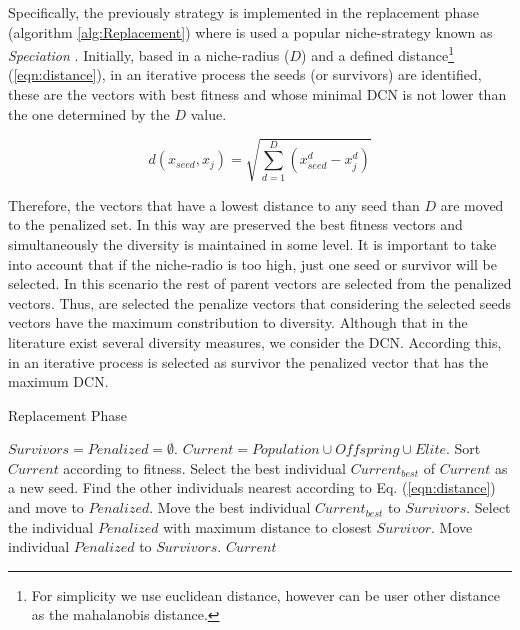 %
Specifically, the previously strategy is implemented in the replacement phase (algorithm \ref{alg:Replacement}) where is used a popular niche-strategy known as \textit{Speciation} \cite{yang2017multimodal}.
%
Initially, based in a niche-radius ($D$) and a defined distance\footnote{For simplicity we use euclidean distance, however can be user other distance as the mahalanobis distance.} (\ref{eqn:distance}), in an iterative process the seeds (or survivors) are identified, these are the vectors with best fitness and whose minimal DCN is not lower than the one determined by the $D$ value.

\begin{equation}\label{eqn:distance}
d ( x_{seed}, x_j ) = \sqrt{ \sum_{d=1}^D (x_{seed}^d - x_j^d )  } 
\end{equation}

%
Therefore, the vectors that have a lowest distance to any seed than $D$ are moved to the penalized set.
%
In this way are preserved the best fitness vectors and simultaneously the diversity is maintained in some level.
%
It is important to take into account that if the niche-radio is too high, just one seed or survivor will be selected.
%
In this scenario the rest of parent vectors are selected from the penalized vectors.
%
Thus, are selected the penalize vectors that considering the selected seeds vectors have the maximum constribution to diversity.
%
Although that in the literature exist several diversity measures, we consider the DCN.
%
According this, in an iterative process is selected as survivor the penalized vector that has the maximum DCN.

\begin{algorithm}[H]
  \scriptsize
	\caption{Replacement Phase} \label{alg:Replacement}
	\begin{algorithmic}[1]
	\STATE $Survivors = Penalized = \emptyset$.
	\STATE $Current = Population \cup Offspring \cup Elite$.
	\STATE Sort $Current$ according to fitness.
	   \STATE Select the best individual $Current_{best}$ of $Current$ as a new seed.
	   \STATE Find the other individuals nearest according to Eq. (\ref{eqn:distance}) and move to $Penalized$.
	   \STATE Move the best individual $Current_{best}$ to $Survivors$.
	\ENDWHILE
	   \STATE Select the individual $Penalized$ with maximum distance to closest $Survivor$.
	   \STATE Move individual $Penalized$ to $Survivors$.
	\ENDWHILE
       \RETURN $Current$
\end{algorithmic}
\end{algorithm}

